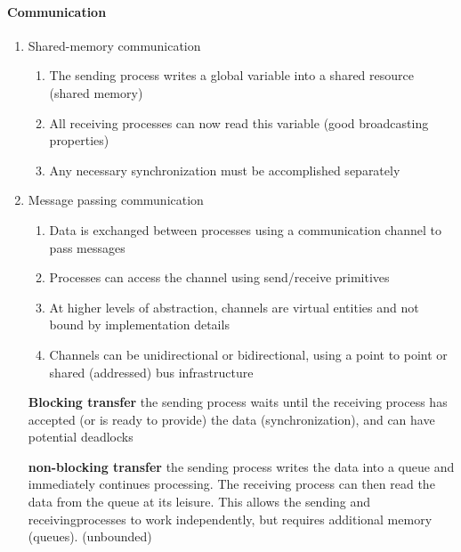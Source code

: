 \documentclass[english]{latex4ei/latex4ei_sheet}
\begin{document}
\paragraph{Communication}
\begin{enumerate}
  \item Shared-memory communication
    \begin{enumerate}
      \item The sending process writes a global variable into a shared resource (shared memory)
      \item All receiving processes can now read this variable (good broadcasting properties)
      \item Any necessary synchronization must be accomplished separately
    \end{enumerate}
  \item Message passing communication
    \begin{enumerate}
    	\item Data is exchanged between processes using a communication channel to pass messages
	\item Processes can access the channel using send/receive primitives
	\item At higher levels of abstraction, channels are virtual entities and not bound by implementation details
	\item  Channels can be unidirectional or bidirectional, using a point to point or shared (addressed) bus infrastructure
    \end{enumerate}

    \textbf{Blocking transfer} the sending process waits until the receiving process has accepted (or is ready to provide) the data (synchronization), and can have potential deadlocks

    \textbf{non-blocking transfer} the sending process writes the data into a queue and immediately continues processing. The receiving process can then read the data from the queue at its leisure. This allows the sending and receivingprocesses to work independently, but requires additional memory (queues). (unbounded)
\end{enumerate}
\end{document}
